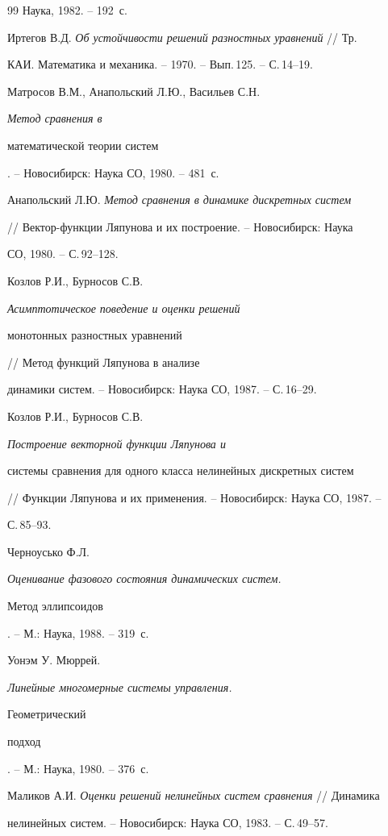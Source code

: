 \begin{thebibliography}{99}
Наука, 1982. -- 192~с.




Иртегов В.Д. {\em Об устойчивости решений разностных уравнений} // Тр.


КАИ. Математика и механика. -- 1970. -- Вып.\,125. -- С.\,14--19.




Матросов В.М., Анапольский Л.Ю., Васильев С.Н. {\em Метод сравнения в


математической теории систем}. -- Новосибирск: Наука СО, 1980. -- 481~с.




Анапольский Л.Ю. {\em Метод сравнения в динамике дискретных систем}


// Вектор-функции Ляпунова и их построение. -- Новосибирск: Наука


СО, 1980. -- С.\,92--128.




Козлов Р.И., Бурносов С.В. {\em Асимптотическое поведение и оценки решений


монотонных разностных уравнений} // Метод функций Ляпунова в анализе


динамики систем. -- Новосибирск: Наука СО, 1987. -- С.\,16--29.




Козлов Р.И., Бурносов С.В. {\em Построение векторной функции Ляпунова и


системы сравнения для одного класса нелинейных дискретных систем}


// Функции Ляпунова и их применения. -- Новосибирск: Наука СО, 1987. --


С.\,85--93.




Черноусько Ф.Л. {\em Оценивание фазового состояния динамических систем.


Метод эллипсоидов}. -- М.: Наука, 1988. -- 319~с.




Уонэм У. Мюррей. {\em Линейные многомерные системы управления.


Геометрический


подход}. -- М.: Наука, 1980. -- 376~с.




Маликов А.И. {\em Оценки решений нелинейных систем сравнения} // Динамика


нелинейных систем. -- Новосибирск: Наука СО, 1983. -- С.\,49--57.



\end{thebibliography}
